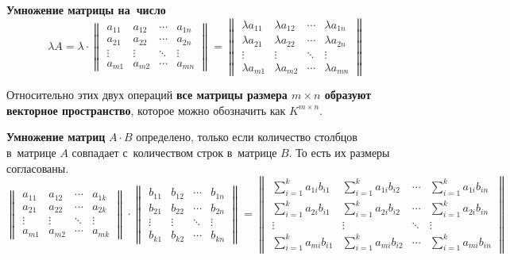 	
\textbf{Умножение матрицы на~число}
\begin{equation*}
\lambda A =
\lambda \cdot
\begin{Vmatrix}
a_{11} & a_{12} & \cdots & a_{1n} \\ 
a_{21} & a_{22} & \cdots & a_{2n} \\ 
\vdots & \vdots & \ddots & \vdots \\ 
a_{m1} & a_{m2} & \cdots & a_{mn}
\end{Vmatrix} =
\begin{Vmatrix}
\lambda a_{11} & \lambda a_{12} & \cdots & \lambda a_{1n} \\ 
\lambda a_{21} & \lambda a_{22} & \cdots & \lambda a_{2n} \\ 
\vdots & \vdots & \ddots & \vdots \\ 
\lambda a_{m1} & \lambda a_{m2} & \cdots & \lambda a_{mn}
\end{Vmatrix}
\end{equation*}

Относительно этих двух операций \textbf{все матрицы размера $m \times n$ образуют векторное пространство}, которое можно обозначить как $K^{m \times n}$.



\textbf{Умножение матриц} $A \cdot B$ определено, только если количество столбцов в~матрице $A$ совпадает с~количеством строк в~матрице $B$. То есть их размеры согласованы.
\begin{equation*}
\begin{Vmatrix}
a_{11} & a_{12} & \cdots & a_{1k} \\ 
a_{21} & a_{22} & \cdots & a_{2k} \\ 
\vdots & \vdots & \ddots & \vdots \\ 
a_{m1} & a_{m2} & \cdots & a_{mk}
\end{Vmatrix} \cdot
\begin{Vmatrix}
b_{11} & b_{12} & \cdots & b_{1n} \\ 
b_{21} & b_{22} & \cdots & b_{2n} \\ 
\vdots & \vdots & \ddots & \vdots \\ 
b_{k1} & b_{k2} & \cdots & b_{kn}
\end{Vmatrix} =
\begin{Vmatrix}
\sum\limits_{i=1}^k a_{1i}b_{i1} & \sum\limits_{i=1}^k a_{1i}b_{i2} & \cdots & \sum\limits_{i=1}^k a_{1i}b_{in} \\
\sum\limits_{i=1}^k a_{2i}b_{i1} & \sum\limits_{i=1}^k a_{2i}b_{i2} & \cdots & \sum\limits_{i=1}^k a_{2i}b_{in} \\
\vdots & \vdots & \ddots & \vdots \\
\sum\limits_{i=1}^k a_{mi}b_{i1} & \sum\limits_{i=1}^k a_{mi}b_{i2} & \cdots & \sum\limits_{i=1}^k a_{mi}b_{in}
\end{Vmatrix}
\end{equation*}


